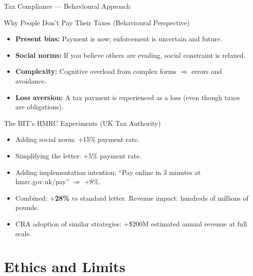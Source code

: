 \documentclass[aspectratio=169]{beamer}
\begin{document}
\begin{frame}{Tax Compliance --- Behavioural Approach}
\begin{block}{Why People Don't Pay Their Taxes (Behavioural Perspective)}
\begin{itemize}
  \item \textbf{Present bias:} Payment is now; enforcement is uncertain and future.
  \item \textbf{Social norms:} If you believe others are evading, social constraint is relaxed.
  \item \textbf{Complexity:} Cognitive overload from complex forms $\Rightarrow$ errors and avoidance.
  \item \textbf{Loss aversion:} A tax payment is experienced as a loss (even though taxes are obligations).
\end{itemize}
\end{block}
\begin{exampleblock}{The BIT's HMRC Experiments (UK Tax Authority)}
\begin{itemize}
  \item Adding social norm: $+$15\% payment rate.
  \item Simplifying the letter: $+$5\% payment rate.
  \item Adding implementation intention: ``Pay online in 3 minutes at hmrc.gov.uk/pay'' $\Rightarrow$ $+$8\%.
  \item Combined: \textbf{$+$28\%} vs standard letter. Revenue impact: hundreds of millions of pounds.
  \item CRA adoption of similar strategies: $+$\$200M estimated annual revenue at full scale.
\end{itemize}
\end{exampleblock}
\end{frame}

\section{Ethics and Limits}
\end{document}
